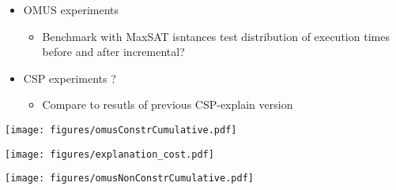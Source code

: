 

\begin{itemize}
    \item OMUS experiments
    \begin{itemize}
        \item Benchmark with MaxSAT isntances test distribution of execution times before and after incremental? 
    \end{itemize}
    \item CSP experiments ? 
    \begin{itemize}
        \item Compare to resutls of previous CSP-explain version
    \end{itemize}
\end{itemize}

\begin{figure*}[]
    \centering
    \texttt{[image: figures/omusConstrCumulative.pdf]}
    \caption{}
    \label{}
\end{figure*}

\begin{figure*}[]
    \centering
    \texttt{[image: figures/explanation\_cost.pdf]}
    \caption{}
    \label{}
\end{figure*}

\begin{figure*}[]
    \centering
    \texttt{[image: figures/omusNonConstrCumulative.pdf]}
    \caption{}
    \label{}
\end{figure*}